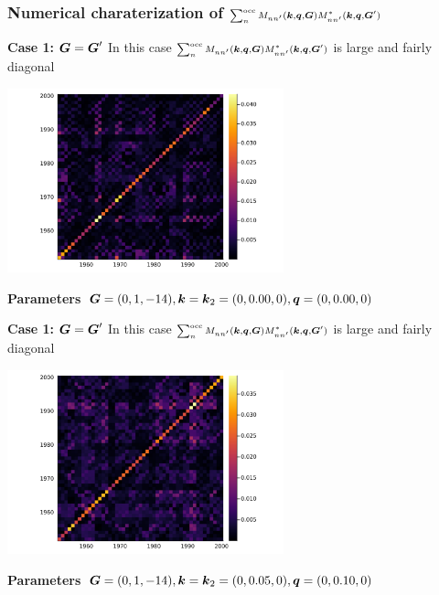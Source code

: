 \documentclass[t]{beamer}
\begin{document}
\begin{frame}[allowframebreaks]
\frametitle{Numerical charaterization of 
$\scriptstyle \sum_{n}^{\text{occ}} M_{n n'} (\vb*{k}, \vb*{q}, \vb*{G}) M^*_{nn'} (\vb*{k}, \vb*{q}, \vb*{G}') $}

\textbf{Case 1: $\vb*{G} = \vb*{G}'$}  In this case $\scriptstyle \sum_{n}^{\text{occ}} M_{n n'} (\vb*{k}, \vb*{q}, \vb*{G}) M^*_{nn'} (\vb*{k}, \vb*{q}, \vb*{G}')$ is large and fairly diagonal

\begin{center}
    \includegraphics[width=0.6\textwidth]{../data/chi/nc_range-1951-2000-k_idx-1-q_idx-1-G_idx-810.png}
\end{center}

\textbf{Parameters} $\vb*{G} = (0, 1, -14), \vb*{k} = \vb*{k}_2 = (0, 0.00, 0), \vb*{q} = (0, 0.00, 0)$

\framebreak

\textbf{Case 1: $\vb*{G} = \vb*{G}'$}  In this case $\scriptstyle \sum_{n}^{\text{occ}} M_{n n'} (\vb*{k}, \vb*{q}, \vb*{G}) M^*_{nn'} (\vb*{k}, \vb*{q}, \vb*{G}')$ is large and fairly diagonal

\begin{center}
    \includegraphics[width=0.6\textwidth]{../data/chi/nc_range-1951-2000-k_idx-2-q_idx-3-G_idx-810.png}
\end{center}

\textbf{Parameters} $\vb*{G} = (0, 1, -14), \vb*{k} = \vb*{k}_2 = (0, 0.05, 0), \vb*{q} = (0, 0.10, 0)$


\end{frame}
\end{document}
